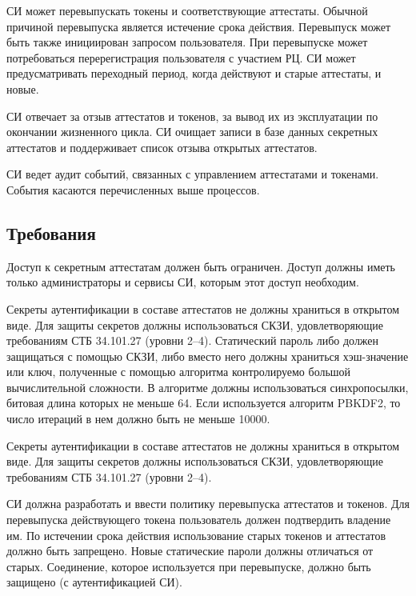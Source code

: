 %

СИ может перевыпускать токены и соответствующие аттестаты. Обычной причиной
перевыпуска является истечение срока действия. Перевыпуск может быть также
инициирован запросом пользователя. При перевыпуске может потребоваться
перерегистрация пользователя с участием РЦ. СИ может предусматривать переходный
период, когда действуют и старые аттестаты, и новые.

СИ отвечает за отзыв аттестатов и токенов, за вывод их из эксплуатации по 
окончании жизненного цикла. 
%
СИ очищает записи в базе данных секретных аттестатов и поддерживает список 
отзыва открытых аттестатов.

СИ ведет аудит событий, связанных с управлением аттестатами и токенами. 
События касаются перечисленных выше процессов.

\subsection{Требования}\label{CM.Reqs}

Доступ к секретным аттестатам должен быть ограничен.
Доступ должны иметь только администраторы и сервисы СИ,
которым этот доступ необходим. 

Секреты аутентификации в составе аттестатов не должны храниться в открытом 
виде. 
%
Для защиты секретов должны использоваться СКЗИ, удовлетворяющие 
требованиям СТБ 34.101.27 (уровни 2--4).
%
Статический пароль либо должен защищаться с помощью СКЗИ, 
либо вместо него должны храниться хэш-значение или ключ, 
полученные с помощью алгоритма контролируемо большой вычислительной 
сложности. В алгоритме должны использоваться синхропосылки, 
битовая длина которых не меньше 64. Если используется алгоритм PBKDF2,
то число итераций в нем должно быть не меньше 10000.

Секреты аутентификации в составе аттестатов не должны храниться в открытом 
виде. Для защиты секретов должны использоваться СКЗИ, удовлетворяющие 
требованиям СТБ 34.101.27 (уровни 2--4).


СИ должна разработать и ввести политику перевыпуска аттестатов и токенов.
Для перевыпуска действующего токена пользователь должен 
подтвердить владение им. По истечении срока действия
использование старых токенов и аттестатов должно быть запрещено. 
Новые статические пароли должны отличаться от старых. 
Соединение, которое используется при перевыпуске, должно быть защищено 
(с аутентификацией СИ). 

